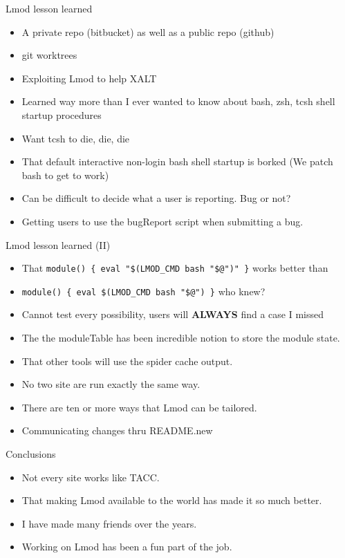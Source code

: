 \documentclass{beamer}
\begin{document}
\begin{frame}{Lmod lesson learned}
  \begin{itemize}
    \item A private repo (bitbucket) as well as a public repo (github)
    \item git worktrees
    \item Exploiting Lmod to help XALT
    \item Learned way more than I ever wanted to know about bash, zsh,
      tcsh shell startup procedures
    \item Want tcsh to die, die, die
    \item That default interactive non-login bash shell startup is
      borked (We patch bash to get to work)
    \item Can be difficult to decide what a user is reporting.  Bug or
      not?
    \item Getting users to use the bugReport script when submitting a
      bug.
  \end{itemize}
\end{frame}

\begin{frame}{Lmod lesson learned (II)}
  \begin{itemize}
    \item That \texttt{module() \{ eval "\$(LMOD\_CMD bash "\$@")" \}}
        works better than
      \item \texttt{module() \{ eval \$(LMOD\_CMD bash "\$@") \}} who
        knew?
      \item Cannot test every possibility, users will \textbf{ALWAYS}
        find a case I missed
      \item The the moduleTable has been incredible notion to store
        the module state.
      \item That other tools will use the spider cache output.
      \item No two site are run exactly the same way.
      \item There are ten or more ways that Lmod can be tailored.
      \item Communicating changes thru README.new
  \end{itemize}
\end{frame}


\begin{frame}{Conclusions}
  \begin{itemize}
    \item Not every site works like TACC.
    \item That making Lmod available to the world has made it so much
      better.
    \item I have made many friends over the years.
    \item Working on Lmod has been a fun part of the job.
  \end{itemize}
\end{frame}
\end{document}
